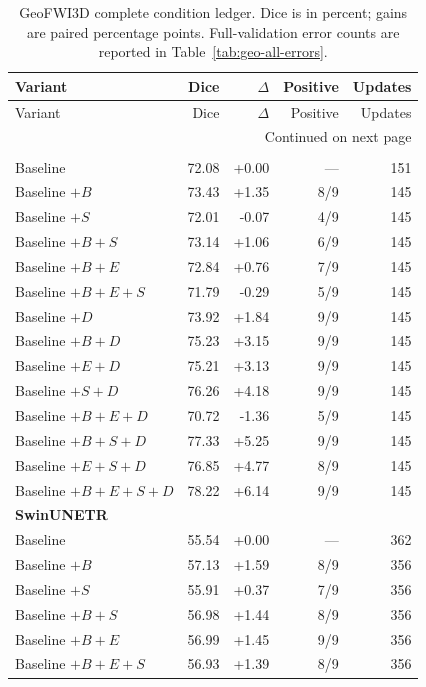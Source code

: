 \documentclass[12pt,a4paper]{article}
\begin{document}
\begingroup\footnotesize{}
\setlength{\tabcolsep}{4pt}
\begin{longtable}{@{}lrrrr@{}}
\caption{GeoFWI3D complete condition ledger. Dice is in percent; gains are paired percentage points. Full-validation error counts are reported in Table~\ref{tab:geo-all-errors}.}\label{tab:geo-ledger}\\
\hline
Variant & Dice & $\Delta$ & Positive & Updates \\ \hline
\endfirsthead
\hline
Variant & Dice & $\Delta$ & Positive & Updates \\ \hline
\endhead
\hline
\multicolumn{5}{r}{Continued on next page}\\
\endfoot
\hline
\endlastfoot
\multicolumn{5}{l}{\textbf{nnU-Net}}\\[.3em]
Baseline & 72.08 & +0.00 & --- & 151 \\
Baseline $+B$ & 73.43 & +1.35 & 8/9 & 145 \\
Baseline $+S$ & 72.01 & -0.07 & 4/9 & 145 \\
Baseline $+B+S$ & 73.14 & +1.06 & 6/9 & 145 \\
Baseline $+B+E$ & 72.84 & +0.76 & 7/9 & 145 \\
Baseline $+B+E+S$ & 71.79 & -0.29 & 5/9 & 145 \\
Baseline $+D$ & 73.92 & +1.84 & 9/9 & 145 \\
Baseline $+B+D$ & 75.23 & +3.15 & 9/9 & 145 \\
Baseline $+E+D$ & 75.21 & +3.13 & 9/9 & 145 \\
Baseline $+S+D$ & 76.26 & +4.18 & 9/9 & 145 \\
Baseline $+B+E+D$ & 70.72 & -1.36 & 5/9 & 145 \\
Baseline $+B+S+D$ & 77.33 & +5.25 & 9/9 & 145 \\
Baseline $+E+S+D$ & 76.85 & +4.77 & 8/9 & 145 \\
Baseline $+B+E+S+D$ & 78.22 & +6.14 & 9/9 & 145 \\
\multicolumn{5}{l}{\textbf{SwinUNETR}}\\[.3em]
Baseline & 55.54 & +0.00 & --- & 362 \\
Baseline $+B$ & 57.13 & +1.59 & 8/9 & 356 \\
Baseline $+S$ & 55.91 & +0.37 & 7/9 & 356 \\
Baseline $+B+S$ & 56.98 & +1.44 & 8/9 & 356 \\
Baseline $+B+E$ & 56.99 & +1.45 & 9/9 & 356 \\
Baseline $+B+E+S$ & 56.93 & +1.39 & 8/9 & 356 \\

\end{longtable}
\end{document}
